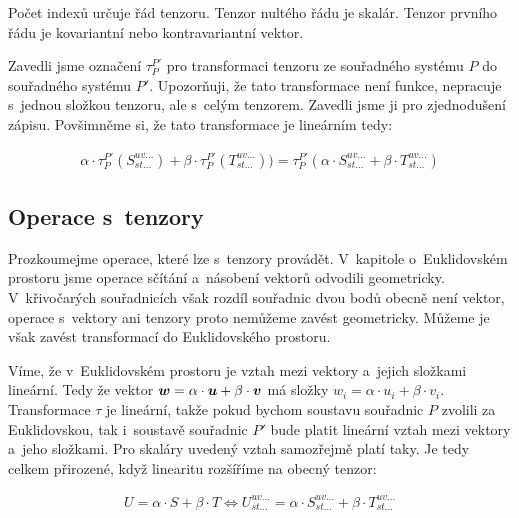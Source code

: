 Počet indexů určuje řád tenzoru. Tenzor nultého řádu je skalár. Tenzor prvního řádu je kovariantní nebo kontravariantní vektor.

Zavedli jsme označení \(\tau_{P}^{P'}\) pro transformaci tenzoru ze souřadného systému \(P\) do souřadného systému \(P'\). Upozorňuji, že tato transformace není funkce, nepracuje s~jednou složkou tenzoru, ale s~celým tenzorem. Zavedli jsme ji pro zjednodušení zápisu. Povšimněme si, že tato transformace je lineárním tedy:

\begin{equation}
\label{eq:linearni_transformace_tenzoru}
\begin{split}
\alpha \cdot \tau_{P}^{P'}(S_{st...}^{uv...}) + \beta \cdot \tau_{P}^{P'}(T_{st...}^{uv...})) = \tau_{P}^{P'}(\alpha \cdot S_{st...}^{uv...} + \beta \cdot T_{st...}^{uv...})
\end{split}
\end{equation}

\subsection{Operace s~tenzory}

Prozkoumejme operace, které lze s~tenzory provádět. V~kapitole o~Euklidovském prostoru jsme operace sčítání a~násobení vektorů odvodili geometricky. V~křivočarých souřadnicích však rozdíl souřadnic dvou bodů obecně není vektor, operace s~vektory ani tenzory proto nemůžeme zavést geometricky. Můžeme je však zavést transformací do Euklidovského prostoru.

Víme, že v~Euklidovském prostoru je vztah mezi vektory a~jejich složkami lineární. Tedy že vektor \(\boldsymbol{w} = \alpha \cdot \boldsymbol{u} + \beta \cdot \boldsymbol{v}\) má složky \(w_i = \alpha \cdot u_i + \beta \cdot v_i\). Transformace \(\tau\) je lineární, takže pokud bychom soustavu souřadnic \(P\) zvolili za Euklidovskou, tak i~soustavě souřadnic \(P'\) bude platit lineární vztah mezi vektory a~jeho složkami. Pro skaláry uvedený vztah samozřejmě platí taky. Je tedy celkem přirozené, když linearitu rozšíříme na obecný tenzor:

\begin{equation}
\label{eq:scitani_a_nasobeni_tenzoru}
\begin{split}
U = \alpha \cdot S + \beta \cdot T \Leftrightarrow U_{st...}^{uv...} = \alpha \cdot S_{st...}^{uv...} + \beta \cdot T_{st...}^{uv...}
\end{split}
\end{equation}

